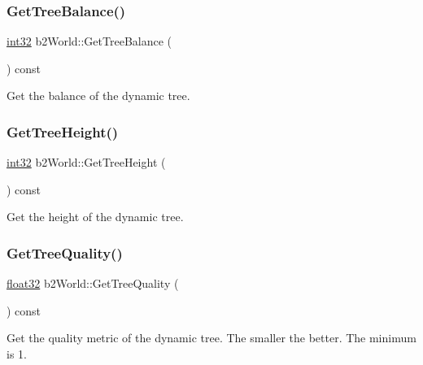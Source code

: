 \mbox{\label{classb2_world_aaca027331f06d93d978b44e065873f80}} 
\subsubsection{\texorpdfstring{GetTreeBalance()}{GetTreeBalance()}}
{\footnotesize\ttfamily \mbox{\hyperlink{b2_settings_8h_a43d43196463bde49cb067f5c20ab8481}{int32}} b2\+World\+::\+Get\+Tree\+Balance (\begin{DoxyParamCaption}{ }\end{DoxyParamCaption}) const}



Get the balance of the dynamic tree. 

\mbox{\label{classb2_world_abc99b2beb6ba79ac6c80f33bac264b52}} 
\subsubsection{\texorpdfstring{GetTreeHeight()}{GetTreeHeight()}}
{\footnotesize\ttfamily \mbox{\hyperlink{b2_settings_8h_a43d43196463bde49cb067f5c20ab8481}{int32}} b2\+World\+::\+Get\+Tree\+Height (\begin{DoxyParamCaption}{ }\end{DoxyParamCaption}) const}



Get the height of the dynamic tree. 

\mbox{\label{classb2_world_a562935b3b8161dd18a467e02f479e88a}} 
\subsubsection{\texorpdfstring{GetTreeQuality()}{GetTreeQuality()}}
{\footnotesize\ttfamily \mbox{\hyperlink{b2_settings_8h_aacdc525d6f7bddb3ae95d5c311bd06a1}{float32}} b2\+World\+::\+Get\+Tree\+Quality (\begin{DoxyParamCaption}{ }\end{DoxyParamCaption}) const}

Get the quality metric of the dynamic tree. The smaller the better. The minimum is 1. \mbox{\label{classb2_world_af23e93dbf44ebfc3c7ce9dfdc00b8ff7}} 
